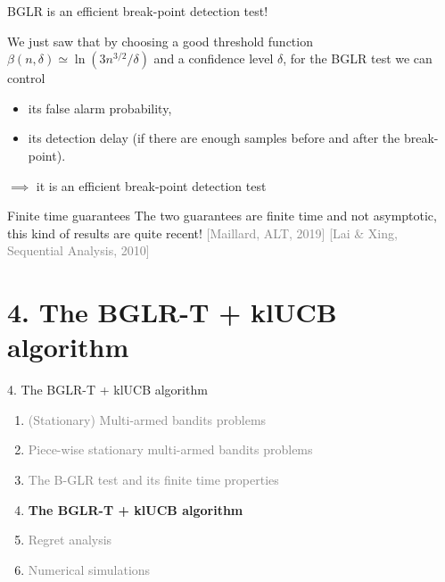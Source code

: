 \documentclass[11pt,english,ignorenonframetext,]{beamer}
\begin{document}
\begin{frame}{BGLR is an efficient break-point detection test!}

  We just saw that by choosing a good threshold function $\beta(n,\delta) \simeq \ln(3n^{3/2}/\delta)$
  and a confidence level $\delta$,
  for the BGLR test we can control
  \begin{itemize}
    \item its false alarm probability,
    \item its detection delay (if there are enough samples before and after the break-point).
  \end{itemize}

  $\implies$ it is an efficient break-point detection test

  \pause
  \begin{block}{Finite time guarantees}
    The two guarantees are \alert{finite time} and not asymptotic, this kind of results are quite recent!
    \hfill{}
    \textcolor{gray}{[Maillard, ALT, 2019]}
    \textcolor{gray}{[Lai \& Xing, Sequential Analysis, 2010]}
  \end{block}

\end{frame}


\section{\hfill{}4. The BGLR-T + klUCB algorithm\hfill{}}

\begin{frame}{4. The BGLR-T + klUCB algorithm}

  \begin{enumerate}
    \item
    \textcolor{gray}{
      (Stationary) Multi-armed bandits problems
    }
    \vspace*{15pt}

    \item
    \textcolor{gray}{
      Piece-wise stationary multi-armed bandits problems
    }
    \vspace*{15pt}

    \item
    \textcolor{gray}{
      The B-GLR test and its finite time properties
    }
    \vspace*{15pt}

    \item
    \alert{\textbf{%
      The BGLR-T + klUCB algorithm
    }}
    \vspace*{15pt}

    \item
    \textcolor{gray}{
      Regret analysis
    }
    \vspace*{15pt}

    \item
    \textcolor{gray}{
      Numerical simulations
    }
  \end{enumerate}

\end{frame}
\end{document}
